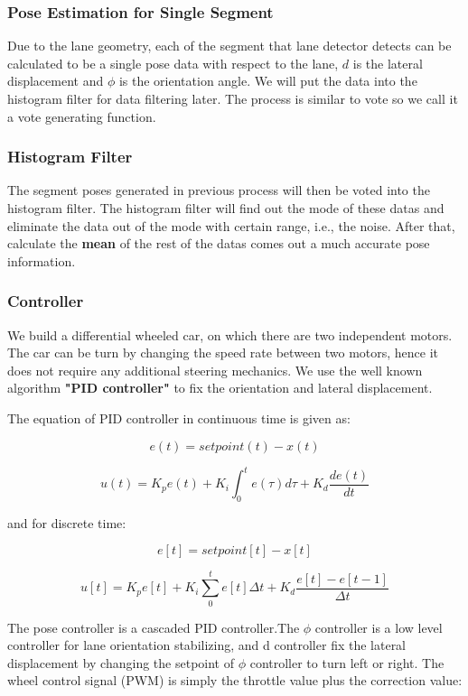 \documentclass[conference]{IEEEtran}
\begin{document}
\subsubsection{Pose Estimation for Single Segment}

Due to the lane geometry, each of the segment that lane detector detects can be calculated to be a single pose data with respect to the lane, $d$ is the lateral displacement and $\phi$ is the orientation angle. We will put the data into the histogram filter for data filtering later. The process is similar to vote so we call it a vote generating function.

\subsubsection{Histogram Filter}

The segment poses generated in previous process will then be voted into the histogram filter. The histogram filter will find out the mode of these datas and eliminate the data out of the mode with certain range, i.e., the noise. After that, calculate the \textbf{mean} of the rest of the datas comes out a much accurate pose information.

\subsubsection{Controller}We build a differential wheeled car, on which there are two independent motors. The car can be turn by changing the speed rate between two motors, hence it does not require any additional steering mechanics.
	We use the well known algorithm \textbf{"PID controller"} to fix the orientation and lateral displacement.

The equation of PID controller in continuous time is given as:

\[e(t) = setpoint(t) - x(t)\]

\[u(t) = K_p e(t) + K_i \int_{0}^{t} e(\tau) d\tau + K_d  \frac{de(t)}{dt}\]

and for discrete time:

\[e[t] = setpoint[t] - x[t]\]

\[u[t] = K_p e[t] + K_i \sum_0^t e[t] \Delta t + K_d \frac{e[t] - e[t-1]}{\Delta t}\]

	The pose controller is a cascaded PID controller.The $\phi$ controller is a low level controller for lane orientation stabilizing, and d controller fix the lateral displacement by changing the setpoint of $\phi$ controller to turn left or right.
The wheel control signal (PWM) is simply the throttle value plus the correction value:
\end{document}

